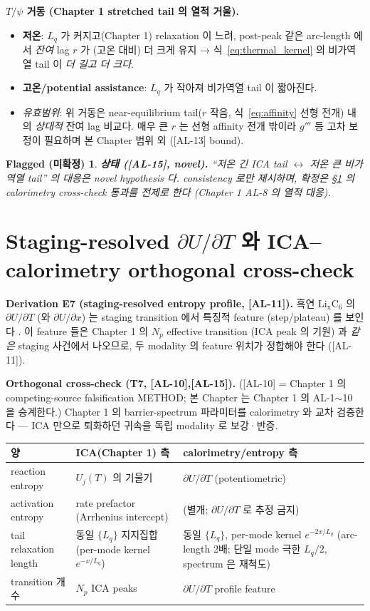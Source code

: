 \documentclass[11pt,a4paper]{article}
\newtheorem*{flagbox}{Flagged (미확정)}
\newcommand{\AL}[1]{\textsf{[AL-#1]}}
\begin{document}
\textbf{$T/\psi$ 거동 (Chapter 1 stretched tail 의 열적 거울).}
\begin{itemize}
\item \textbf{저온}: $L_q$ 가 커지고(Chapter 1) relaxation 이 느려, post-peak 같은 arc-length 에서
  \emph{잔여} lag $r$ 가 (고온 대비) 더 크게 유지 → 식~\eqref{eq:thermal_kernel} 의 비가역열 tail 이
  \emph{더 길고 더 크다}.
\item \textbf{고온/potential assistance}: $L_q$ 가 작아져 비가역열 tail 이 짧아진다.
\item \emph{유효범위}: 위 거동은 near-equilibrium tail($r$ 작음, 식~\eqref{eq:affinity} 선형 전개)
  내의 \emph{상대적} 잔여 lag 비교다. 매우 큰 $r$ 는 선형 affinity 전개 밖이라 $g'''$ 등 고차 보정이
  필요하며 본 Chapter 범위 외 (\AL{13} bound).
\end{itemize}
\begin{flagbox}
\textbf{상태 (\AL{15}, novel).} ``저온 긴 ICA tail $\leftrightarrow$ 저온 큰 비가역열 tail'' 의
대응은 novel hypothesis 다. consistency 로만 제시하며, \emph{확정}은 \S\ref{sec:cross_check} 의
calorimetry cross-check 통과를 전제로 한다 (Chapter 1 AL-8 의 열적 대응).
\end{flagbox}

\section{Staging-resolved $\partial U/\partial T$ 와 ICA--calorimetry orthogonal cross-check}\label{sec:cross_check}
\textbf{Derivation E7 (staging-resolved entropy profile, \AL{11}).} 흑연 $\mathrm{Li_xC_6}$ 의
$\partial U/\partial T$ (와 $\partial U/\partial x$) 는 staging transition 에서 특징적 feature
(step/plateau) 를 보인다 \cite{reynier2003}. 이 feature 들은 Chapter 1 의 $N_p$ effective
transition (ICA peak 의 기원) 과 \emph{같은} staging 사건에서 나오므로, 두 modality 의 feature
위치가 정합해야 한다 (\AL{11}).

\textbf{Orthogonal cross-check (T7, \AL{10},\AL{15}).} (\AL{10} = Chapter 1 의 competing-source
falsification METHOD; 본 Chapter 는 Chapter 1 의 AL-1$\sim$10 을 승계한다.) Chapter 1 의
barrier-spectrum 파라미터를 calorimetry 와 교차 검증한다 — ICA 만으로 퇴화하던 귀속을 독립
modality 로 보강·반증.
\begin{longtable}{p{} p{} p{}}
\toprule 양 & ICA(Chapter 1) 측 & calorimetry/entropy 측 \\ \midrule \endhead
reaction entropy & $U_j(T)$ 의 기울기 & $\partial U/\partial T$ (potentiometric) \\
activation entropy & rate prefactor (Arrhenius intercept) & (별개; $\partial U/\partial T$ 로 추정 금지) \\
tail relaxation length & 동일 $\{L_q\}$ 지지집합 (per-mode kernel $e^{-x/L_q}$) & 동일 $\{L_q\}$, per-mode kernel $e^{-2x/L_q}$ (arc-length 2배; 단일 mode 극한 $L_q/2$, spectrum 은 재척도) \\
transition 개수 & $N_p$ ICA peaks & $\partial U/\partial T$ profile feature \\
\bottomrule
\end{longtable}
\end{document}
